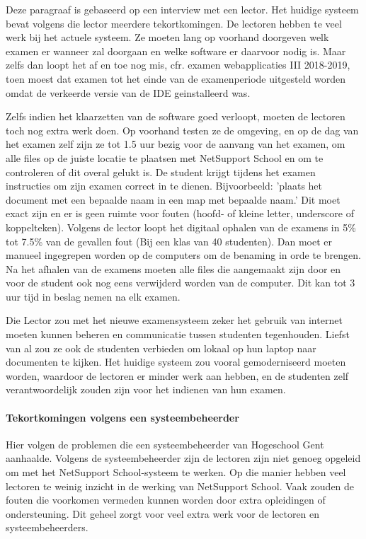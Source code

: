 Deze paragraaf is gebaseerd op een interview met een lector. Het huidige systeem bevat volgens die lector meerdere tekortkomingen. De lectoren hebben te veel werk bij het actuele systeem. Ze moeten lang op voorhand doorgeven welk examen er wanneer zal doorgaan en welke software er daarvoor nodig is. Maar zelfs dan loopt het af en toe nog mis, cfr. examen webapplicaties III 2018-2019, toen moest dat examen tot het einde van de examenperiode uitgesteld worden omdat de verkeerde versie van de IDE geinstalleerd was.

Zelfs indien het klaarzetten van de software goed verloopt, moeten de lectoren toch nog extra werk doen. Op voorhand testen ze de omgeving, en op de dag van het examen zelf zijn ze tot 1.5 uur bezig voor de aanvang van het examen, om alle files op de juiste locatie te plaatsen met NetSupport School en om te controleren of dit overal gelukt is. De student krijgt tijdens het examen instructies om zijn examen correct in te dienen. Bijvoorbeeld: 'plaats het document met een bepaalde naam in een map met bepaalde naam.' Dit moet exact zijn en er is geen ruimte voor fouten (hoofd- of kleine letter, underscore of koppelteken). Volgens de lector loopt het digitaal ophalen van de examens in 5\% tot 7.5\% van de gevallen fout (Bij een klas van 40 studenten).
Dan moet er manueel ingegrepen worden op de computers om de benaming in orde te brengen. Na het afhalen van de examens moeten alle files die aangemaakt zijn door en voor de student ook nog eens verwijderd worden van de computer. Dit kan tot 3 uur tijd in beslag nemen na elk examen.  

Die Lector zou met het nieuwe examensysteem zeker het gebruik van internet moeten kunnen beheren en communicatie tussen studenten tegenhouden. Liefst van al zou ze ook de studenten verbieden om lokaal op hun laptop naar documenten te kijken. Het huidige systeem zou vooral gemoderniseerd moeten worden, waardoor de lectoren er minder werk aan hebben, en de studenten zelf verantwoordelijk zouden zijn voor het indienen van hun examen. 


\paragraph{Tekortkomingen volgens een systeembeheerder}
Hier volgen de problemen die een systeembeheerder van Hogeschool Gent aanhaalde. Volgens de systeembeheerder zijn de lectoren zijn niet genoeg opgeleid om met het NetSupport School-systeem te werken. Op die manier hebben veel lectoren te weinig inzicht in de werking van NetSupport School. Vaak zouden de fouten die voorkomen vermeden kunnen worden door extra opleidingen of ondersteuning. Dit geheel zorgt voor veel extra werk voor de lectoren en systeembeheerders. 

